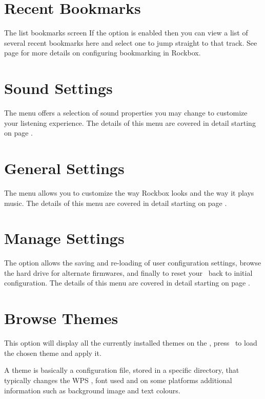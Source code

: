\section {Recent Bookmarks}
%
  {The list bookmarks screen}{}
If the  option is enabled 
then you can view a list of several recent bookmarks here and select one to 
jump straight to that track. See page \pageref{ref:Bookmarkconfigactual} 
for more details on configuring bookmarking in Rockbox.

\section{Sound Settings}
The  menu offers a selection of sound properties you may 
change to customize your listening experience.  The details of this menu are 
covered in detail starting on page \pageref{ref:configure_rockbox_sound}. 

\section{General Settings}
The  menu allows you to customize the way Rockbox looks 
and the way it plays music.  The details of this menu are covered in detail 
starting on page \pageref{ref:configure_rockbox_general}.

\section{Manage Settings}
The  option allows the saving and re-loading of user 
configuration settings, browse the hard drive for alternate firmwares, and finally
to reset your \dap\ back to initial configuration. The details of this menu are 
covered in detail starting on page \pageref{ref:ManageSetting}.

\section{Browse Themes}
This option will display all the currently installed themes on the \dap, 
press \ButtonRight\ to load the chosen theme and apply it.

A theme is basically a configuration file, stored in a specific directory, 
that typically changes the WPS 
, font used and on some platforms
additional information such as background image and text colours.

